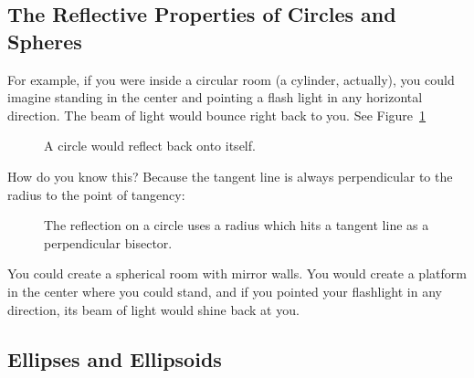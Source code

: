 \subsection{The Reflective Properties of Circles and Spheres}

For example, if you were inside a circular room (a cylinder,
actually), you could imagine standing in the center and pointing a
flash light in any horizontal direction. The beam of light would
bounce right back to you. See Figure~\ref{fig:circlReflection}

\begin{figure}[H]
  \centering
  \caption{A circle would reflect back onto itself.}
  \label{fig:circlReflection}
\end{figure}

How do you know this?  Because the tangent line is always perpendicular to the radius to the point of tangency:
\begin{figure}[H]
  \centering
  \caption{The reflection on a circle uses a radius which hits a tangent line as a perpendicular bisector.}
  \label{fig:tangentCircle}
\end{figure}

You could create a spherical room with mirror walls. You would
create a platform in the center where you could stand, and if you
pointed your flashlight in any direction, its beam of light would
shine back at you.

\subsection{Ellipses and Ellipsoids}

